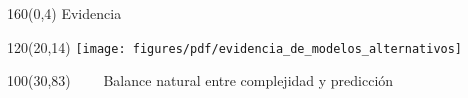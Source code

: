 \documentclass[shownotes,aspectratio=169]{beamer}
\begin{document}
% 
% 
% 
% 
% 
% 
% 
% 
% 
% 
% 
% 
% 



\begin{frame}[plain]
\begin{textblock}{160}(0,4)
\centering \Large  Evidencia
\end{textblock}


 \begin{textblock}{120}(20,14)
  \centering
  \texttt{[image: figures/pdf/evidencia\_de\_modelos\_alternativos]} 
 \end{textblock} 
 
 
 \begin{textblock}{100}(30,83)
  \centering
 \ \ \ \  Balance natural entre complejidad y predicci\'on
  \end{textblock}
\end{frame}
\end{document}
